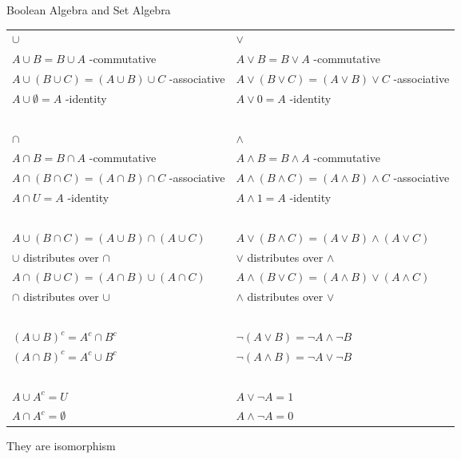 \documentclass[12pt, a4paper, oneside]{article}
\begin{document}
    \begin{remark}
        Boolean Algebra and Set Algebra

        \vspace{0.5em}
        \noindent
        \begin{tabularx}{\textwidth}{X | X}
            $\cup$& $\vee$ \\
            $A \cup B = B \cup A$ -commutative& $A \vee B = B \vee A$ -commutative\\
            $A \cup (B \cup C) = (A \cup B) \cup C$ -associative & $A \vee (B \vee C) = (A \vee B) \vee C$ -associative\\
            $A \cup \emptyset = A$ -identity & $A \vee 0 = A$ -identity\\
            ~ & ~ \\
            $\cap$& $\wedge$\\
            $A \cap B = B \cap A$ -commutative& $A \wedge B = B \wedge A$ -commutative\\
            $A \cap (B \cap C) = (A \cap B) \cap C$ -associative & $A \wedge (B \wedge C) = (A \wedge B) \wedge C$ -associative\\
            $A \cap U = A$ -identity & $A \wedge 1 = A$ -identity\\
            ~ & ~ \\
            $A \cup (B \cap C) = (A \cup B) \cap (A \cup C)$ & $A \vee (B \wedge C) = (A \vee B) \wedge (A \vee C)$ \\
            $\cup$ distributes over $\cap$ & $\vee$ distributes over $\wedge$ \\
            $A \cap (B \cup C) = (A \cap B) \cup (A \cap C)$ & $A \wedge (B \vee C) = (A \wedge B) \vee (A \wedge C)$ \\
            $\cap$ distributes over $\cup$ & $\wedge$ distributes over $\vee$ \\
            ~ & ~ \\
            $(A \cup B)^c = A^c \cap B^c$ & $\neg(A \vee B) = \neg A \wedge \neg B$ \\
            $(A \cap B)^c = A^c \cup B^c$ & $\neg(A \wedge B) = \neg A \vee \neg B$ \\
            ~ & ~ \\
            $A \cup A^c = U$ & $A \vee \neg A = 1$ \\
            $A \cap A^c = \emptyset$ & $A \wedge \neg A = 0$ \\
        \end{tabularx}

        They are isomorphism
        \vspace{0.5em}
    \end{remark}
\end{document}

